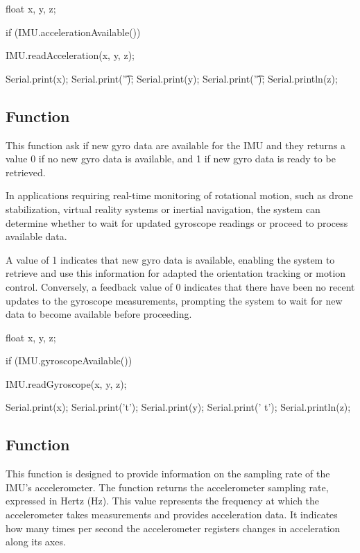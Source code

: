 \begin{Arduino}
	float x, y, z;
	
	if (IMU.accelerationAvailable()) {
		IMU.readAcceleration(x, y, z);
		
		Serial.print(x);
		Serial.print('\t');
		Serial.print(y);
		Serial.print('\t');
		Serial.println(z); }

\end{Arduino}


\subsection{Function }

This function ask if new gyro data are available for the IMU and they returns a value 0 if no new gyro data is available, and 1 if new gyro data is ready to be retrieved.

In applications requiring real-time monitoring of rotational motion, such as drone stabilization, virtual reality systems or inertial navigation, the system can determine whether to wait for updated gyroscope readings or proceed to process available data. \cite{Arduino_IMU_Gyroscope:2024}

A value of 1 indicates that new gyro data is available, enabling the system to retrieve and use this information for adapted the orientation tracking or motion control. Conversely, a feedback value of 0 indicates that there have been no recent updates to the gyroscope measurements, prompting the system to wait for new data to become available before proceeding.

\begin{Arduino}
	float x, y, z;
	
	if (IMU.gyroscopeAvailable()) {
		IMU.readGyroscope(x, y, z);
		
		Serial.print(x);
		Serial.print('t');
		Serial.print(y);
		Serial.print(' t');
		Serial.println(z); }
\end{Arduino}


\subsection{Function }

This function is designed to provide information on the sampling rate of the IMU's accelerometer. The function  returns the accelerometer sampling rate, expressed in Hertz (Hz). This value represents the frequency at which the accelerometer takes measurements and provides acceleration data. It indicates how many times per second the accelerometer registers changes in acceleration along its axes. \cite{STMicroelectronics_LSM9DS1:2024}

